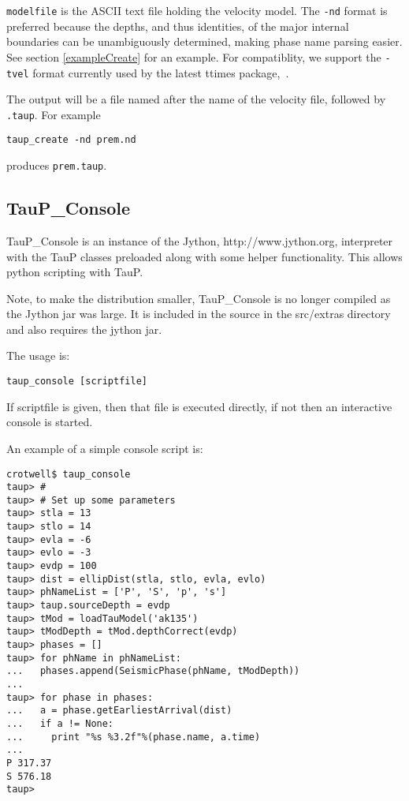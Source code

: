 \texttt{modelfile} is the ASCII text file holding the velocity model.
The \texttt{-nd} format is preferred 
because the depths, and thus identities, of the major internal boundaries can 
be unambiguously determined, making phase name parsing easier. 
See section \ref{exampleCreate} for an example.
For compatiblity, we support the \texttt{-tvel} format 
currently used by the latest ttimes package,~. 

The output will be a file named after the name of the 
velocity file, followed by \texttt{.taup}. For example

\texttt{taup\_create -nd prem.nd}

produces \texttt{prem.taup}.

\subsection{TauP\_Console}
TauP\_Console is an instance of the Jython, http://www.jython.org, interpreter with the TauP classes
preloaded along with some helper functionality. This allows python scripting with TauP.

Note, to make the distribution smaller, TauP\_Console is no longer compiled as the Jython jar was large. It is included in the source in the src/extras directory and also requires the jython jar.

The usage is:
\begin{verbatim}
taup_console [scriptfile]
\end{verbatim} 

If scriptfile is given, then that file is executed directly, if not then an interactive console is started.

An example of a simple console script is:
\begin{verbatim}
crotwell$ taup_console
taup> #
taup> # Set up some parameters
taup> stla = 13
taup> stlo = 14
taup> evla = -6
taup> evlo = -3
taup> evdp = 100
taup> dist = ellipDist(stla, stlo, evla, evlo)
taup> phNameList = ['P', 'S', 'p', 's']
taup> taup.sourceDepth = evdp
taup> tMod = loadTauModel('ak135')
taup> tModDepth = tMod.depthCorrect(evdp)
taup> phases = []
taup> for phName in phNameList:
...   phases.append(SeismicPhase(phName, tModDepth))
... 
taup> for phase in phases:
...   a = phase.getEarliestArrival(dist)
...   if a != None:
...     print "%s %3.2f"%(phase.name, a.time)
... 
P 317.37
S 576.18
taup> 
\end{verbatim}


